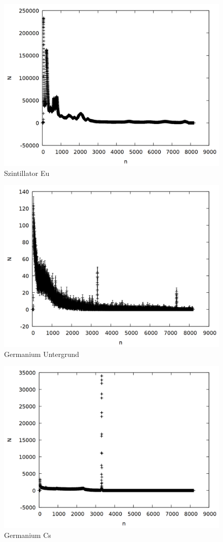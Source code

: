 \begin{figure}
\centering
\includegraphics[width=0.7\linewidth]{data/si_eu_raw.png}
\caption{Szintillator Eu}
\end{figure}

\begin{figure}
\centering
\includegraphics[width=0.7\linewidth]{data/ge_unter.png}
\caption{Germanium Untergrund}
\end{figure}

\begin{figure}
\centering
\includegraphics[width=0.7\linewidth]{data/ge_cs_raw.png}
\caption{Germanium Cs}
\end{figure}

